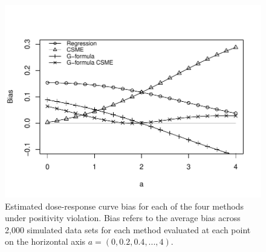 \documentclass[12pt]{article}
\begin{document}
\newpage

\begin{figure}
\centering
\includegraphics[width=6in]{app_fig2_updated.pdf}
\caption{Estimated dose-response curve bias for each of the four methods under positivity violation. Bias refers to the average bias across 2,000 simulated data sets for each method evaluated at each point on the horizontal axis $a = (0, 0.2, 0.4, ..., 4)$.}
\end{figure}

\clearpage
\newpage



\end{document}
